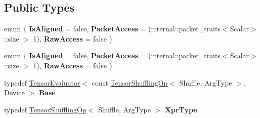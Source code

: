 \subsection*{Public Types}
\begin{DoxyCompactItemize}
\item 
\mbox{\label{struct_eigen_1_1_tensor_evaluator_3_01_tensor_shuffling_op_3_01_shuffle_00_01_arg_type_01_4_00_01_device_01_4_aa8ea85ab937b8c40fe5e5e1a051a28aa}} 
enum \{ {\bfseries Is\+Aligned} = false, 
{\bfseries Packet\+Access} = (internal\+:\+:packet\+\_\+traits$<$Scalar$>$\+:\+:size $>$ 1), 
{\bfseries Raw\+Access} = false
 \}
\item 
\mbox{\label{struct_eigen_1_1_tensor_evaluator_3_01_tensor_shuffling_op_3_01_shuffle_00_01_arg_type_01_4_00_01_device_01_4_a279d4a0ad6f411442805d914760db7c9}} 
enum \{ {\bfseries Is\+Aligned} = false, 
{\bfseries Packet\+Access} = (internal\+:\+:packet\+\_\+traits$<$Scalar$>$\+:\+:size $>$ 1), 
{\bfseries Raw\+Access} = false
 \}
\item 
\mbox{\label{struct_eigen_1_1_tensor_evaluator_3_01_tensor_shuffling_op_3_01_shuffle_00_01_arg_type_01_4_00_01_device_01_4_add66a6fef5cd46add3f80c992c5e1d09}} 
typedef \hyperlink{struct_eigen_1_1_tensor_evaluator}{Tensor\+Evaluator}$<$ const \hyperlink{class_eigen_1_1_tensor_shuffling_op}{Tensor\+Shuffling\+Op}$<$ Shuffle, Arg\+Type $>$, Device $>$ {\bfseries Base}
\item 
\mbox{\label{struct_eigen_1_1_tensor_evaluator_3_01_tensor_shuffling_op_3_01_shuffle_00_01_arg_type_01_4_00_01_device_01_4_aa465930d0884332605f8adc9951db88c}} 
typedef \hyperlink{class_eigen_1_1_tensor_shuffling_op}{Tensor\+Shuffling\+Op}$<$ Shuffle, Arg\+Type $>$ {\bfseries Xpr\+Type}
\item 
\mbox{\label{struct_eigen_1_1_tensor_evaluator_3_01_tensor_shuffling_op_3_01_shuffle_00_01_arg_type_01_4_00_01_device_01_4_a91d69b45dfa4acfa441a669ca5f16a2f}} 

\end{DoxyCompactItemize}
